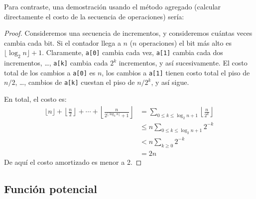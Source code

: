   Para contraste,
  una demostración usando el método agregado
  (calcular directamente el costo de la secuencia de operaciones)
  sería:
  \begin{proof}
    Consideremos una secuencia de incrementos,
    y consideremos cuántas veces cambia cada bit.
    Si el contador llega a \(n\)
    (\(n\) operaciones)
    el bit más alto es \(\lfloor \log_2 n \rfloor + 1\).
    Claramente,
    \lstinline!a[0]! cambia cada vez,
    \lstinline!a[1]! cambia cada dos incrementos,
    \ldots,
    \lstinline!a[k]! cambia cada \(2^k\) incrementos,
    y así sucesivamente.
    El costo total de los cambios a \lstinline!a[0]! es \(n\),
    los cambios a \lstinline!a[1]! tienen costo total el piso de \(n / 2\),
    \ldots,
    cambios de \lstinline!a[k]! cuestan el piso de \(n / 2^k\),
    y así sigue.

    En total,
    el costo es:
    \begin{align*}
      \lfloor n \rfloor
         + \left\lfloor \frac{n}{2} \right\rfloor
         + \dotsb
         + \left\lfloor
             \frac{n}{2^{\lfloor \log_2 n \rfloor}+ 1}
           \right\rfloor
        &=   \sum_{0 \le k \le \log_2 n + 1}
               \left\lfloor \frac{n}{2^k} \right\rfloor \\
        &\le n \sum_{0 \le k \le \log_2 n + 1} 2^{-k} \\
        &<   n \sum_{k \ge 0} 2^{-k} \\
        &=   2 n
    \end{align*}
    De aquí el costo amortizado es menor a \num{2}.
  \end{proof}

\subsection{Función potencial}
\label{sec:funcion-potencial}

